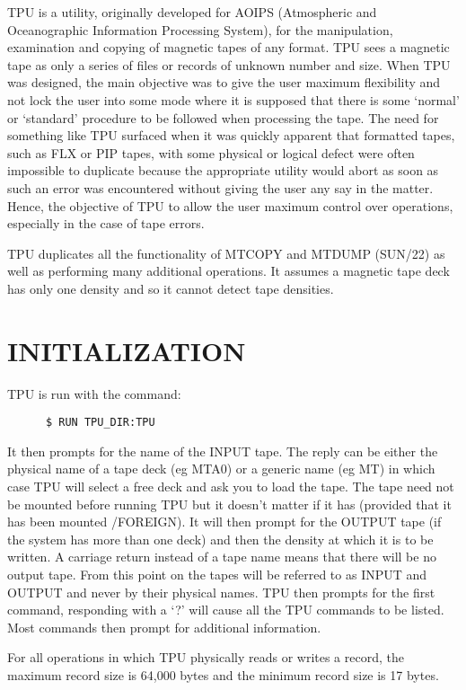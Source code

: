 TPU is a utility, originally developed for AOIPS (Atmospheric and Oceanographic
Information Processing System), for the manipulation, examination and copying of
magnetic tapes of any format.
TPU sees a magnetic tape as only a series of files or records of unknown number
and size.
When TPU was designed, the main objective was to give the user maximum
flexibility and not lock the user into some mode where it is supposed that there
is some `normal' or `standard' procedure to be followed when processing the
tape.
The need for something like TPU surfaced when it was quickly apparent that
formatted tapes, such as FLX or PIP tapes, with some physical or logical defect
were often impossible to duplicate because the appropriate utility would abort
as soon as such an error was encountered without giving the user any say in the
matter.
Hence, the objective of TPU to allow the user maximum control over operations,
especially in the case of tape errors.

TPU duplicates all the functionality of MTCOPY and MTDUMP (SUN/22) as well as
performing many additional operations.
It assumes a magnetic tape deck has only one density and so it cannot detect
tape densities.

\section{INITIALIZATION}

TPU is run with the command:

\begin{verbatim}
      $ RUN TPU_DIR:TPU
\end{verbatim}

It then prompts for the name of the INPUT tape.
The reply can be either the physical name of a tape deck (eg MTA0) or a generic
name (eg MT) in which case TPU will select a free deck and ask you to load the
tape.
The tape need not be mounted before running TPU but it doesn't matter if it has
(provided that it has been mounted /FOREIGN).
It will then prompt for the OUTPUT tape (if the system has more than one deck)
and then the density at which it is to be written.
A carriage return instead of a tape name means that there will be no output
tape.
From this point on the tapes will be referred to as INPUT and OUTPUT and never
by their physical names.
TPU then prompts for the first command, responding with a `?' will cause all the
TPU commands to be listed.
Most commands then prompt for additional information.

For all operations in which TPU physically reads or writes a record, the
maximum record size is 64,000 bytes and the minimum record size is 17 bytes.

